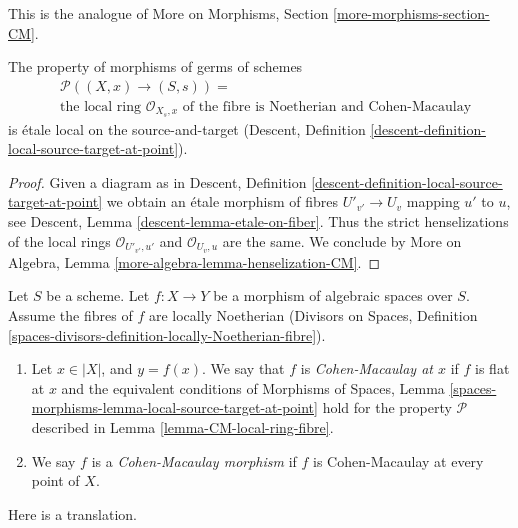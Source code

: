 \noindent
This is the analogue of More on Morphisms, Section
\ref{more-morphisms-section-CM}.

\begin{lemma}
\label{lemma-CM-local-ring-fibre}
The property of morphisms of germs of schemes
\begin{align*}
& \mathcal{P}((X, x) \to (S, s)) = \\
& \text{the local ring }
\mathcal{O}_{X_s, x}
\text{ of the fibre is Noetherian and Cohen-Macaulay}
\end{align*}
is \'etale local on the source-and-target (Descent, Definition
\ref{descent-definition-local-source-target-at-point}).
\end{lemma}

\begin{proof}
Given a diagram as in
Descent, Definition \ref{descent-definition-local-source-target-at-point}
we obtain an \'etale morphism of fibres
$U'_{v'} \to U_v$ mapping $u'$ to $u$, see
Descent, Lemma \ref{descent-lemma-etale-on-fiber}.
Thus the strict henselizations of the local rings
$\mathcal{O}_{U'_{v'}, u'}$ and $\mathcal{O}_{U_v, u}$
are the same. We conclude by
More on Algebra, Lemma \ref{more-algebra-lemma-henselization-CM}.
\end{proof}

\begin{definition}
\label{definition-CM}
Let $S$ be a scheme.
Let $f : X \to Y$ be a morphism of algebraic spaces over $S$.
Assume the fibres of $f$ are locally Noetherian
(Divisors on Spaces, Definition
\ref{spaces-divisors-definition-locally-Noetherian-fibre}).
\begin{enumerate}
\item Let $x \in |X|$, and $y = f(x)$. We say that $f$ is
{\it Cohen-Macaulay at $x$} if $f$ is flat at $x$ and
the equivalent conditions of
Morphisms of Spaces, Lemma
\ref{spaces-morphisms-lemma-local-source-target-at-point}
hold for the property $\mathcal{P}$ described in
Lemma \ref{lemma-CM-local-ring-fibre}.
\item We say $f$ is a {\it Cohen-Macaulay morphism} if $f$ is
Cohen-Macaulay at every point of $X$.
\end{enumerate}
\end{definition}

\noindent
Here is a translation.

